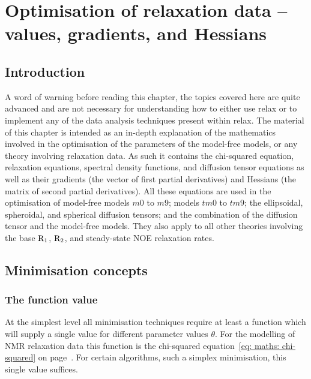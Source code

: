 
\chapter{Optimisation of relaxation data -- values, gradients, and Hessians} \label{ch: values, gradients, and Hessians}




\section{Introduction}


A word of warning before reading this chapter, the topics covered here are quite advanced and are not necessary for understanding how to either use relax or to implement any of the data analysis techniques present within relax.  The material of this chapter is intended as an in-depth explanation of the mathematics involved in the optimisation of the parameters of the model-free models, or any theory involving relaxation data.  As such it contains the chi-squared equation, relaxation equations, spectral density functions, and diffusion tensor equations as well as their gradients (the vector of first partial derivatives) and Hessians (the matrix of second partial derivatives).  All these equations are used in the optimisation of model-free models $m0$ to $m9$; models $tm0$ to $tm9$; the ellipsoidal, spheroidal, and spherical diffusion tensors; and the combination of the diffusion tensor and the model-free models.  They also apply to all other theories involving the base $\mathrm{R}_1$, $\mathrm{R}_2$, and steady-state NOE relaxation rates.




\section{Minimisation concepts}

\subsection{The function value}

At the simplest level all minimisation techniques require at least a function which will supply a single value for different parameter values $\theta$.  For the modelling of NMR relaxation data this function is the chi-squared equation~\eqref{eq: maths: chi-squared} on page~\pageref{eq: maths: chi-squared}.  For certain algorithms, such a simplex minimisation, this single value suffices.



